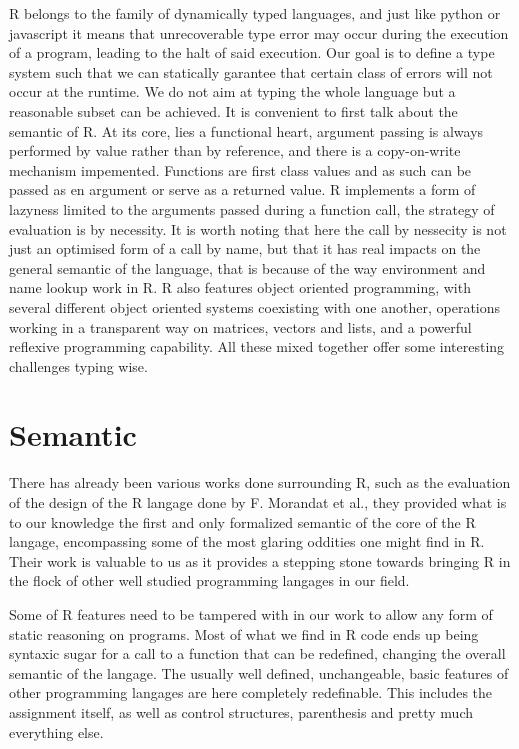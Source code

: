R belongs to the family of dynamically typed languages, and just like python or javascript it means that unrecoverable type error may occur during the execution of a program, leading to the halt of said execution. Our goal is to define a type system such that we can statically garantee that certain class of errors will not occur at the runtime. We do not aim at typing the whole language but a reasonable subset can be achieved.
It is convenient to first talk about the semantic of R. At its core, lies a functional heart, argument passing is always performed by value rather than by reference, and there is a copy-on-write mechanism impemented. Functions are first class values and as such can be passed as en argument or serve as a returned value. R implements a form of lazyness limited to the arguments passed during a function call, the strategy of evaluation is by necessity. It is worth noting that here the call by nessecity is not just an optimised form of a call by name, but that it has real impacts on the general semantic of the language, that is because of the way environment and name lookup work in R. R also features object oriented programming, with several different object oriented systems coexisting with one another, operations working in a transparent way on matrices, vectors and lists, and a powerful reflexive programming capability. All these mixed together offer some interesting challenges typing wise.


\section{Semantic}

There has already been various works done surrounding R, such as the evaluation of the design of the R langage done by F. Morandat et al., they provided what is to our knowledge the first and only formalized semantic of the core of the R langage, encompassing some of the most glaring oddities one might find in R. Their work is valuable to us as it provides a stepping stone towards bringing R in the flock of other well studied programming langages in our field.

Some of R features need to be tampered with in our work to allow any form of static reasoning on programs. Most of what we find in R code ends up being syntaxic sugar for a call to a function that can be redefined, changing the overall semantic of the langage. The usually well defined, unchangeable, basic features of other programming langages are here completely redefinable. This includes the assignment itself, as well as control structures, parenthesis and pretty much everything else.

